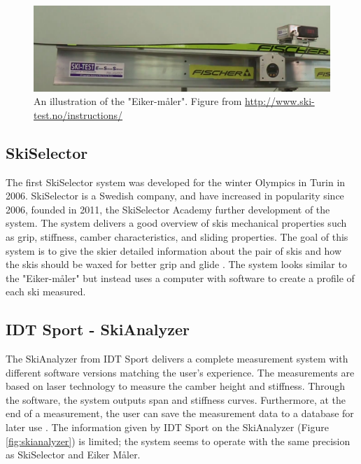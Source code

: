 \begin{figure}
    \centering
    \includegraphics[width=1\textwidth]{figures/eiker.png}
    \caption{An illustration of the "Eiker-måler". Figure from \url{http://www.ski-test.no/instructions/}}
    \label{fig:eikermåler}
\end{figure}

\subsection{SkiSelector}
\label{subsec:skiselector}
The first SkiSelector system was developed for the winter Olympics in Turin in 2006. SkiSelector is a Swedish company, and have increased in popularity since 2006, founded in 2011, the SkiSelector Academy further development of the system. The system delivers a good overview of skis mechanical properties such as grip, stiffness, camber characteristics, and sliding properties. The goal of this system is to give the skier detailed information about the pair of skis and how the skis should be waxed for better grip and glide \citep{skiselector_2018}. The system looks similar to the "Eiker-måler" but instead uses a computer with software to create a profile of each ski measured.

\subsection{IDT Sport - SkiAnalyzer}
\label{subsec:idt}
The SkiAnalyzer from IDT Sport delivers a complete measurement system with different software versions matching the user's experience. The measurements are based on laser technology to measure the camber height and stiffness. Through the software, the system outputs span and stiffness curves. Furthermore, at the end of a measurement, the user can save the measurement data to a database for later use \citep{idt_2018}. The information given by IDT Sport on the SkiAnalyzer (Figure \ref{fig:skianalyzer}) is limited; the system seems to operate with the same precision as SkiSelector and Eiker Måler.

